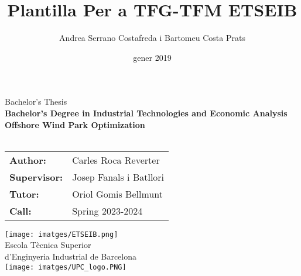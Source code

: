 \documentclass[a4paper,11pt, titlepage, twoside]{article}
\title{Plantilla Per a TFG-TFM ETSEIB}
\author{Andrea Serrano Costafreda i Bartomeu Costa Prats }
\date{gener 2019}
\begin{document}
\renewcommand{\refname}{Bibliography}
\begin{titlepage}
    {\centering
    {\Huge Bachelor's Thesis}\\
    \vspace{5mm}
    {\Large \textbf{Bachelor's Degree in Industrial Technologies and Economic Analysis}}\\
    \vspace{20mm}
    \Huge \textbf{Offshore Wind Park Optimization}\\
    \vspace{10mm}
    \vspace{3mm}
    \Large{}\\  %
    }
    \vspace{20mm}
    \hspace{2mm}
    \begin{tabular}{l@{ } l}
        \vspace{5mm}
        \Large \textbf{Author:} & \Large{Carles Roca Reverter} \\
        \vspace{5mm}
        \Large\textbf{Supervisor:} & \Large{Josep Fanals i Batllori}\\
        \vspace{5mm}
        \Large\textbf{Tutor:} & \Large{Oriol Gomis Bellmunt}\\
        
         \Large\textbf{Call: } & \Large{Spring 2023-2024}\\
    \end{tabular}\par
    \vspace{10mm}
    {\centering
    \texttt{[image: imatges/ETSEIB.png]}\\
    {\Large Escola Tècnica Superior \\ d'Enginyeria Industrial de Barcelona}\\
    \vspace{3mm}
    \texttt{[image: imatges/UPC\_logo.PNG]}
    \par
    }
    \end{titlepage}

\clearpage
\thispagestyle{empty}
\null\newpage 
{}
\end{document}
